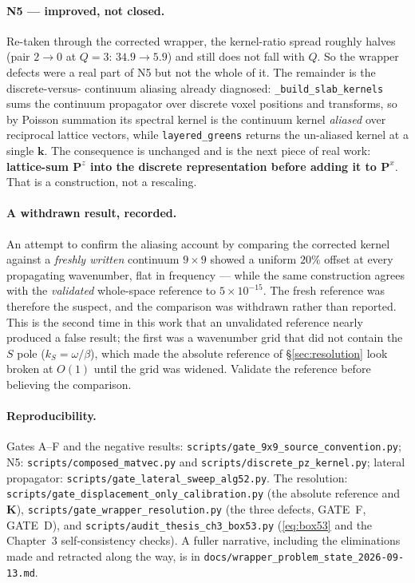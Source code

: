 \documentclass[11pt,a4paper]{article}
\newcommand{\bP}{\mathbf{P}}
\newcommand{\bK}{\mathbf{K}}
\begin{document}
\paragraph{N5 --- improved, not closed.}  Re-taken through the corrected
wrapper, the kernel-ratio spread roughly halves (pair $2\!\to\!0$ at $Q=3$:
$34.9 \to 5.9$) and still does not fall with $Q$.  So the wrapper defects were a
real part of N5 but not the whole of it.  The remainder is the discrete-versus-
continuum aliasing already diagnosed: \texttt{\_build\_slab\_kernels} sums the
continuum propagator over discrete voxel positions and transforms, so by Poisson
summation its spectral kernel is the continuum kernel \emph{aliased} over
reciprocal lattice vectors, while \texttt{layered\_greens} returns the un-aliased
kernel at a single $\mathbf{k}$.  The consequence is unchanged and is the next
piece of real work: \textbf{lattice-sum $\bP^{z}$ into the discrete
representation before adding it to $\bP^{x}$}.  That is a construction, not a
rescaling.

\paragraph{A withdrawn result, recorded.}  An attempt to confirm the aliasing
account by comparing the corrected kernel against a \emph{freshly written}
continuum $9\times9$ showed a uniform $20\%$ offset at every propagating
wavenumber, flat in frequency --- while the same construction agrees with the
\emph{validated} whole-space reference to $5\times10^{-15}$.  The fresh
reference was therefore the suspect, and the comparison was withdrawn rather
than reported.  This is the second time in this work that an unvalidated
reference nearly produced a false result; the first was a wavenumber grid that
did not contain the $S$ pole ($k_S = \omega/\beta$), which made the absolute
reference of \S\ref{sec:resolution} look broken at $O(1)$ until the grid was
widened.  Validate the reference before believing the comparison.

\paragraph{Reproducibility.}  Gates A--F and the negative results:
\texttt{scripts/gate\_9x9\_source\_convention.py};
N5: \texttt{scripts/composed\_matvec.py} and
\texttt{scripts/discrete\_pz\_kernel.py};
lateral propagator: \texttt{scripts/gate\_lateral\_sweep\_alg52.py}.
The resolution: \texttt{scripts/gate\_displacement\_only\_calibration.py}
(the absolute reference and $\bK$),
\texttt{scripts/gate\_wrapper\_resolution.py} (the three defects, GATE~F,
GATE~D), and \texttt{scripts/audit\_thesis\_ch3\_box53.py}
(\eqref{eq:box53} and the Chapter~3 self-consistency checks).  A fuller
narrative, including the eliminations made and retracted along the way, is in
\texttt{docs/wrapper\_problem\_state\_2026-09-13.md}.
\end{document}
